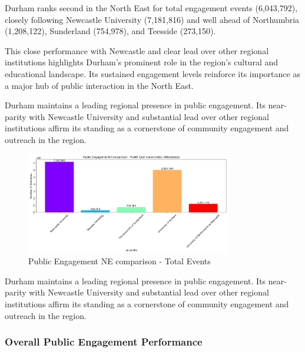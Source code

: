 \documentclass[journal,onecolumn, 10pt,draftclsnofoot]{IEEEtran}
\begin{document}
Durham ranks second in the North East for total engagement events (6,043,792), closely following Newcastle University (7,181,816) and well ahead of Northumbria (1,208,122), Sunderland (754,978), and Teesside (273,150).

This close performance with Newcastle and clear lead over other regional institutions highlights Durham's prominent role in the region's cultural and educational landscape. Its sustained engagement levels reinforce its importance as a major hub of public interaction in the North East.



Durham maintains a leading regional presence in public engagement. Its near-parity with Newcastle University and substantial lead over other regional institutions affirm its standing as a cornerstone of community engagement and outreach in the region.

\begin{figure}[h]
\centering
\includegraphics[width=0.8\textwidth]{Fig/figure34.ne_comparison.png}
\caption{Public Engagement NE comparison - Total Events}
\label{fig:ne-comparison}
\end{figure}

Durham maintains a leading regional presence in public engagement. Its near-parity with Newcastle University and substantial lead over other regional institutions affirm its standing as a cornerstone of community engagement and outreach in the region.

\subsubsection{Overall Public Engagement Performance}
\end{document}
